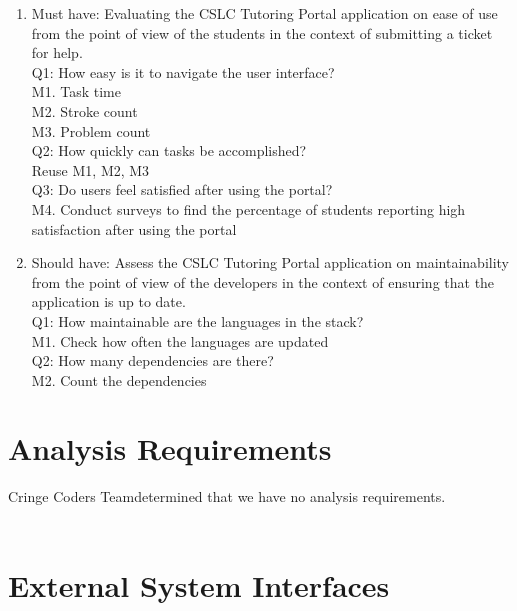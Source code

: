 \documentclass[oneside,openany,obeyspaces]{book}
\newcommand\tab[1][1cm]{\hspace*{#1}}
\newcommand\TeamName{Cringe Coders Team}
\begin{document}
\begin{flushleft}
    \begin{enumerate}
        \item Must have: Evaluating the CSLC Tutoring Portal application on ease of use from the point of view of the students in the context of submitting a ticket for help.\\
              \tab Q1: How easy is it to navigate the user interface?\\
              \tab\tab M1. Task time\\
              \tab\tab M2. Stroke count\\
              \tab\tab M3. Problem count\\
              \tab Q2: How quickly can tasks be accomplished?\\
              \tab\tab Reuse M1, M2, M3\\
              \tab Q3: Do users feel satisfied after using the portal?\\
              \tab\tab M4. Conduct surveys to find the percentage of students reporting high satisfaction after using the portal\\

        \item Should have: Assess the CSLC Tutoring Portal application on maintainability from the point of view of the developers in the context of ensuring that the application is up to date.\\
              \tab Q1: How maintainable are the languages in the stack?\\
              \tab\tab M1. Check how often the languages are updated\\
              \tab Q2: How many dependencies are there?\\
              \tab\tab M2. Count the dependencies\\
    \end{enumerate}


    \section{Analysis Requirements}

    \tab \TeamName determined that we have no analysis requirements.\\~\\


    \section{External System Interfaces}


\end{flushleft}
\end{document}
